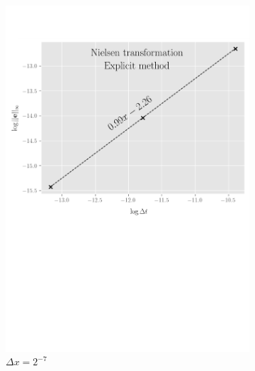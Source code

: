 \begin{figure}[tbp]
\begin{subfigure}{0.4\textwidth}
    \includegraphics[width=\textwidth]{chapters/chapter3/ConvergenceTimeExplicitNielsen.pdf}
    \caption{$\Delta{t}=2^{-15},2^{-17},\dots,2^{-21}$}
    \caption*{$\Delta{x}=2^{-7}$}
    \label{fig:finitedifferencesschemes:numericaresults:nielsen_explicit_time}
  \end{subfigure}
  \begin{subfigure}{0.4\textwidth}
    \centering

\end{subfigure}
\end{figure}
